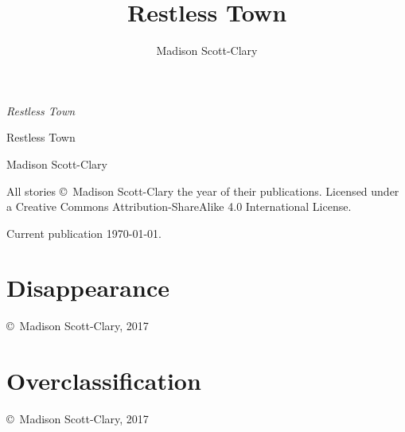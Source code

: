 \documentclass[10pt]{memoir}
\title{Restless Town}
\author{Madison Scott-Clary}
\date{}
\begin{document}
  \frontmatter
  \pagestyle{empty}
  \null
  \vfill

  \hfill\textit{Restless Town}

  \vfill
  \cleardoublepage
  \null
  \vfill
  \begin{raggedleft}
    {\Huge Restless Town}

    \vspace{0.4in}

    {\Large Madison Scott-Clary}

    \vfill

  \end{raggedleft}
  \newpage
  \null
  \vfill

  {\small
  \noindent All stories \copyright\ Madison Scott-Clary the year of their publications. Licensed under a Creative Commons Attribution-ShareAlike 4.0 International License.

  \vspace{0.25in}

  \noindent Current publication \today.
  }

  \vfill
  \newpage
  \tableofcontents*
  \thispagestyle{empty}

  \mainmatter

  \pagestyle{fancyplain}

  \chapter*{Disappearance}
  \thispagestyle{empty}
  
  \vfill
  \begin{center}
    \tiny \copyright\ Madison Scott-Clary, 2017
  \end{center}

  \chapter*{Overclassification}
  \thispagestyle{empty}
  
  \vfill
  \begin{center}
    \tiny \copyright\ Madison Scott-Clary, 2017
  \end{center}
\end{document}

